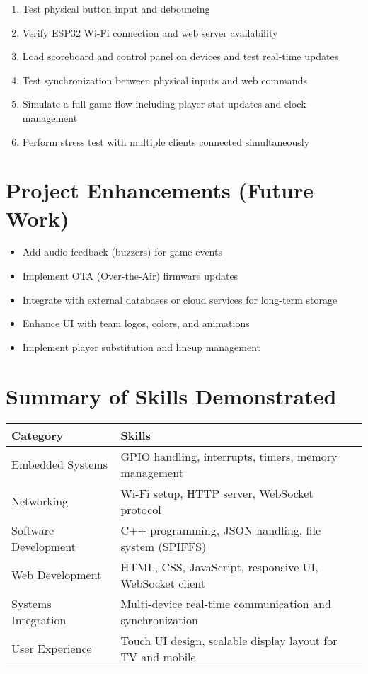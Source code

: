 \documentclass[a4paper,12pt]{article}
\begin{document}
\begin{enumerate}[label=\arabic*.]
    \item Test physical button input and debouncing
    \item Verify ESP32 Wi-Fi connection and web server availability
    \item Load scoreboard and control panel on devices and test real-time updates
    \item Test synchronization between physical inputs and web commands
    \item Simulate a full game flow including player stat updates and clock management
    \item Perform stress test with multiple clients connected simultaneously
\end{enumerate}

\section{Project Enhancements (Future Work)}

\begin{itemize}[noitemsep]
    \item Add audio feedback (buzzers) for game events
    \item Implement OTA (Over-the-Air) firmware updates
    \item Integrate with external databases or cloud services for long-term storage
    \item Enhance UI with team logos, colors, and animations
    \item Implement player substitution and lineup management
\end{itemize}

\section*{Summary of Skills Demonstrated}

\begin{tabular}{ll}
\textbf{Category} & \textbf{Skills} \\
\hline
Embedded Systems & GPIO handling, interrupts, timers, memory management \\
Networking & Wi-Fi setup, HTTP server, WebSocket protocol \\
Software Development & C++ programming, JSON handling, file system (SPIFFS) \\
Web Development & HTML, CSS, JavaScript, responsive UI, WebSocket client \\
Systems Integration & Multi-device real-time communication and synchronization \\
User Experience & Touch UI design, scalable display layout for TV and mobile \\
\end{tabular}
\end{document}
